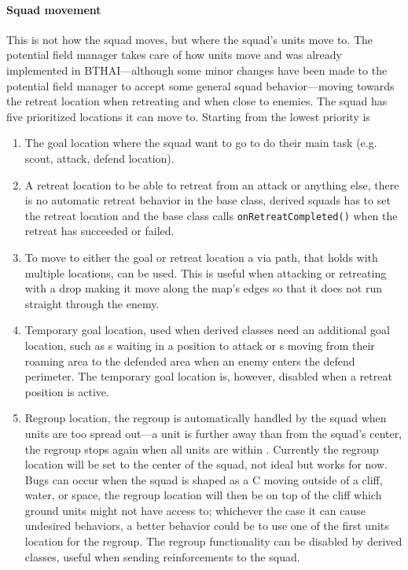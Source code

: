 \paragraph{Squad movement}
This is not how the squad moves, but where the squad's units move to. The potential field manager takes care of how units move and was already implemented in BTHAI\cite{bthai}—although some minor changes have been made to the potential field manager to accept some general squad behavior—moving towards the retreat location when retreating and when close to enemies. The squad has five prioritized locations it can move to. Starting from the lowest priority is
\begin{enumerate}
	\item The goal location where the squad want to go to do their main task (e.g. scout, attack, defend location).
	\item A retreat location to be able to retreat from an attack or anything else, there is no automatic retreat behavior in the base class, derived squads has to set the retreat location and the base class calls \texttt{onRetreatCompleted()} when the retreat has succeeded or failed.
	\item To move to either the goal or retreat location a via path, that holds with multiple locations, can be used. This is useful when attacking or retreating with a drop making it move along the map's edges so that it does not run straight through the enemy.
	\item Temporary goal location, used when derived classes need an additional goal location, such as s waiting in a position to attack or s moving from their roaming area to the defended area when an enemy enters the defend perimeter. The temporary goal location is, however, disabled when a retreat position is active.
	\item Regroup location, the regroup is automatically handled by the squad when units are too spread out—a unit is further away than \squadRegroupDistanceBegin from the squad's center, the regroup stops again when all units are within \squadRegroupDistanceEnd. Currently the regroup location will be set to the center of the squad, not ideal but works for now. Bugs can occur when the squad is shaped as a C moving outside of a cliff, water, or space, the regroup location will then be on top of the cliff which ground units might not have access to; whichever the case it can cause undesired behaviors, a better behavior could be to use one of the first units location for the regroup. The regroup functionality can be disabled by derived classes, useful when sending reinforcements to the squad.
\end{enumerate}


